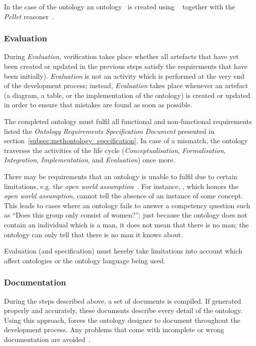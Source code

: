 In the case of the \smarthomeweather ontology an  ontology~\cite{OWL} is created using \protege~\cite{protege} together with the \emph{Pellet} reasoner~\cite{pellet}.

\subsubsection{Evaluation}

During \emph{Evaluation}, verification takes place whether all artefacts that have yet been created or updated in the previous steps satisfy the requirements that have been initially). \emph{Evaluation} is not an activity which is performed at the very end of the development process; instead, \emph{Evaluation} takes place whenever an artefact (a diagram, a table, or the implementation of the ontology) is created or updated in order to ensure that mistakes are found as soon as possible.

The completed ontology must fulfil all functional and non-functional requirements listed the \emph{Ontology Requirements Specification Document} presented in section~\ref{subsec:methontology_specification}. In case of a mismatch, the ontology traverses the activities of the life cycle (\emph{Conceptualisation}, \emph{Formalisation}, \emph{Integration}, \emph{Implementation}, and \emph{Evaluation}) once more.

There may be requirements that an ontology is unable to fulfil due to certain limitations, e.g. the \emph{open world assumption}~\cite{open_world_assumption1}. For instance, , which honors the \emph{open world assumption}, cannot tell the absence of an instance of some concept. This leads to cases where an ontology fails to answer a competency question such as ``Does this group only consist of women?''; just because the ontology does not contain an individual which is a man, it does not mean that there is no man; the ontology can only tell that there is no man it knows about.

Evaluation (and specification) must hereby take limitations into account which affect ontologies or the ontology language being used.

\subsubsection{Documentation}

During the steps described above, a set of documents is compiled. If generated properly and accurately, these documents describe every detail of the ontology. Using this approach, \methontology forces the ontology designer to document throughout the development process. Any problems that come with incomplete or wrong documentation are avoided~\cite{SoftwareDocumentationProblems}.

